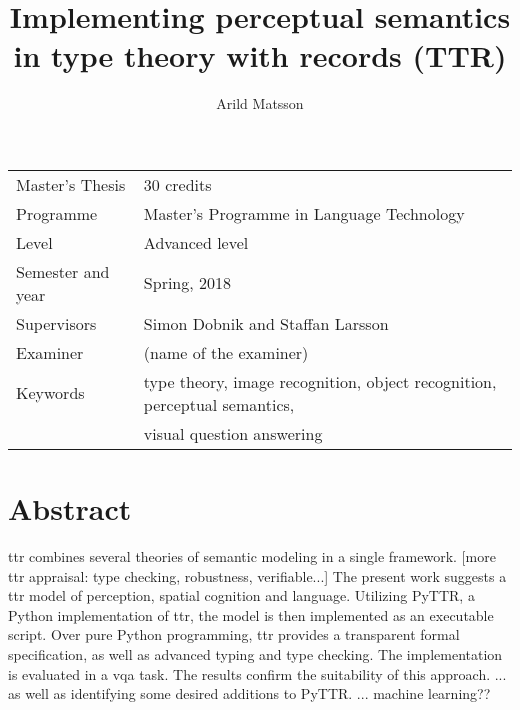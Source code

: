 \documentclass[11pt, a4paper]{article}
\title{Implementing perceptual semantics in type theory with records (TTR)}
\author{Arild Matsson}
\date{}
\begin{document}
\begin{titlepage}

\maketitle

\vfill

\begingroup
\renewcommand*{\arraystretch}{1.2}
\begin{tabular}{l@{\hskip 20mm}l}
\hline
Master's Thesis & 30 credits\\
Programme & Master’s Programme in Language Technology\\
Level & Advanced level \\
Semester and year & Spring, 2018\\
Supervisors & Simon Dobnik and Staffan Larsson\\
Examiner & (name of the examiner)\\
Keywords & type theory, image recognition, object recognition, perceptual semantics, \\
& visual question answering
\end{tabular}
\endgroup

\thispagestyle{empty}
\end{titlepage}

\newpage
\singlespacing
\glsresetall
\section*{Abstract}

\Gls{ttr} combines several theories of semantic modeling in a single framework.
[more ttr appraisal: type checking, robustness, verifiable...]
The present work suggests a \gls{ttr} model of perception, spatial cognition and language.
Utilizing PyTTR, a Python implementation of \gls{ttr}, the model is then implemented as an executable script.
Over pure Python programming, \gls{ttr} provides a transparent formal specification, as well as advanced typing and type checking.
The implementation is evaluated in a \acrlong{vqa} task.
The results confirm the suitability of this approach.
... as well as identifying some desired additions to PyTTR.
... machine learning??
\end{document}
